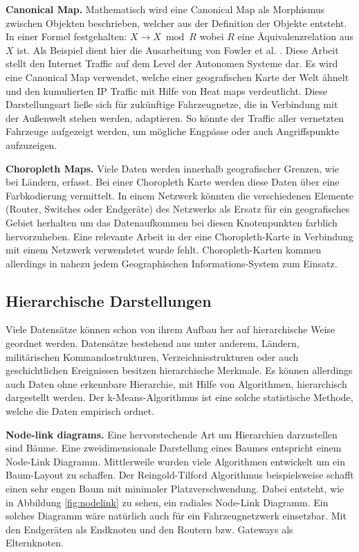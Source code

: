 \documentclass[draft=false
              ,paper=a4
              ,twoside=false
              ,fontsize=11pt
              ,headsepline
              ,BCOR10mm
              ,DIV11
              ]{scrbook}
\begin{document}
\textbf{Canonical Map.} Mathematisch wird eine Canonical Map als Morphismus zwischen Objekten beschrieben, welcher aus der Definition der Objekte entsteht. In einer Formel festgehalten: $X \rightarrow X \bmod R $ wobei $R$ eine Äquivalenzrelation aus $X$ ist. Als Beispiel dient hier die Ausarbeitung von Fowler et al. \cite{Fowler:2014:IVN:2671491.2671501}. Diese Arbeit stellt den Internet Traffic auf dem Level der Autonomen Systeme dar. Es wird eine Canonical Map verwendet, welche einer geografischen Karte der Welt ähnelt und den kumulierten IP Traffic mit Hilfe von Heat maps verdeutlicht. Diese Darstellungsart ließe sich für zukünftige Fahrzeugnetze, die in Verbindung mit der Außenwelt stehen werden, adaptieren. So könnte der Traffic aller vernetzten Fahrzeuge aufgezeigt werden, um mögliche Engpässe oder auch Angriffspunkte aufzuzeigen.

\textbf{Choropleth Maps.} Viele Daten werden innerhalb geografischer Grenzen, wie bei Ländern, erfasst. Bei einer Choropleth Karte werden diese Daten über eine Farbkodierung vermittelt. In einem Netzwerk könnten die verschiedenen Elemente (Router, Switches oder Endgeräte) des Netzwerks als Ersatz für ein geografisches Gebiet herhalten um das Datenaufkommen bei diesen Knotenpunkten farblich hervorzuheben. Eine relevante Arbeit in der eine Choropleth-Karte in Verbindung mit einem Netzwerk verwendetet wurde fehlt. Choropleth-Karten kommen allerdings in nahezu jedem Geographischen Informations-System zum Einsatz.

\subsection{Hierarchische Darstellungen} %
\label{ssub:hierachische_darstellungen}
Viele Datensätze können schon von ihrem Aufbau her auf hierarchische Weise geordnet werden. Datensätze bestehend aus unter anderem, Ländern, militärischen Kommandostrukturen, Verzeichnisstrukturen oder auch geschichtlichen Ereignissen besitzen hierarchische Merkmale. Es können allerdings auch Daten ohne erkennbare Hierarchie, mit Hilfe von Algorithmen, hierarchisch dargestellt werden. Der k-Means-Algorithmus ist eine solche statistische Methode, welche die Daten empirisch ordnet. 

\textbf{Node-link diagrams.} Eine hervorstechende Art um Hierarchien darzustellen sind Bäume. Eine zweidimensionale Darstellung eines Baumes entspricht einem Node-Link Diagramm. Mittlerweile wurden viele Algorithmen entwickelt um ein Baum-Layout zu schaffen. Der Reingold-Tilford Algorithmus \cite{reingold_tidier_1981} beispielsweise schafft einen sehr engen Baum mit minimaler Platzverschwendung. Dabei entsteht, wie in Abbildung \ref{fig:nodelink} zu sehen, ein radiales Node-Link Diagramm. Ein solches Diagramm wäre natürlich auch für ein Fahrzeugnetzwerk einsetzbar. Mit den Endgeräten als Endknoten und den Routern bzw. Gateways als Elternknoten.
\end{document}
